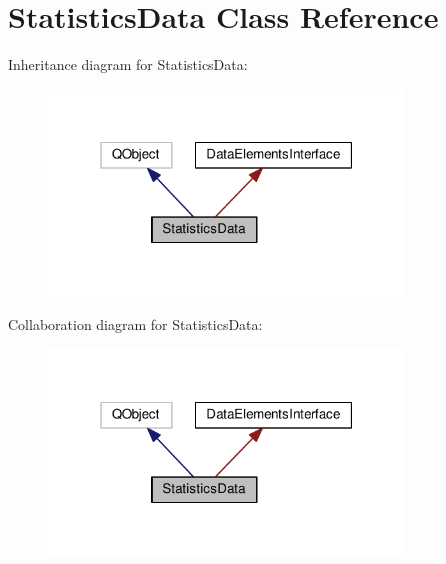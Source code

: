 \hypertarget{class_statistics_data}{}\section{Statistics\+Data Class Reference}
\label{class_statistics_data}


Inheritance diagram for Statistics\+Data\+:
\nopagebreak
\begin{figure}[H]
\begin{center}
\leavevmode
\includegraphics[width=268pt]{class_statistics_data__inherit__graph}
\end{center}
\end{figure}


Collaboration diagram for Statistics\+Data\+:
\nopagebreak
\begin{figure}[H]
\begin{center}
\leavevmode
\includegraphics[width=268pt]{class_statistics_data__coll__graph}
\end{center}
\end{figure}

